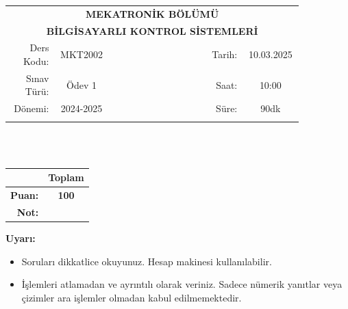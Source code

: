 \newcommand\UniversiteAdi{Niğde Ömer Halisdemir Üniversitesi}
\newcommand\BolumAdi{MEKATRONİK BÖLÜMÜ}
\newcommand\DersKodu{MKT2002}
\newcommand\DersAdi{BİLGİSAYARLI KONTROL SİSTEMLERİ}
\newcommand\SinavAdi{Ödev 1}
\newcommand\SinavTarihi{10.03.2025}
\newcommand\SinavSaati{10:00}
\newcommand\SinavSuresi{90dk}

\pagestyle{fancy}
\fancyhf{} %
\noindent
\begin{tabular}{
    p{0.15\linewidth}
    p{0.15\linewidth}
    p{0.3\linewidth}
    p{0.1\linewidth}
    p{0.15\linewidth}}
    \multicolumn{5}{c}{\textbf{\BolumAdi}}\\
    \multicolumn{5}{c}{\textbf{\DersAdi}}\\\hline
    \multicolumn{1}{|r|}{Ders Kodu:}&
    \multicolumn{1}{|c|}{\DersKodu}&
    \multicolumn{1}{|c|}{}& 
    \multicolumn{1}{|r|}{Tarih:}&
    \multicolumn{1}{|c|}{\SinavTarihi} \\\hline
    \multicolumn{1}{|r|}{Sınav Türü:}&
    \multicolumn{1}{|c|}{\SinavAdi}&  
    \multicolumn{1}{|c|}{}&
    \multicolumn{1}{|r|}{Saat:}&
    \multicolumn{1}{|c|}{\SinavSaati}\\\hline
    \multicolumn{1}{|r|}{Dönemi:}&
    \multicolumn{1}{|c|}{2024-2025}&
    \multicolumn{1}{|c|}{}&
    \multicolumn{1}{|r|}{Süre:}&
    \multicolumn{1}{|c|}{\SinavSuresi} \\\hline
    &&&&\\
\end{tabular}\\\\
\noindent\begin{center}
\begin{tabular}{|r|c|}\hline
    &\textbf{Toplam}\\\hline
    \textbf{Puan:} &\textbf{100}\\\hline
    \textbf{Not:}  &\\\hline
\end{tabular}\end{center}
\noindent\textbf{Uyarı:}
\begin{itemize}\bfseries
    \item Soruları dikkatlice okuyunuz. Hesap makinesi kullanılabilir.
    \item İşlemleri atlamadan ve ayrıntılı olarak veriniz. Sadece nümerik yanıtlar veya çizimler ara işlemler olmadan kabul edilmemektedir.
\end{itemize}

